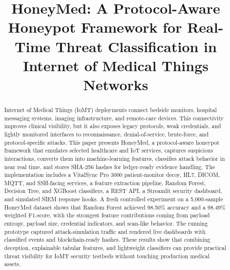 \documentclass[conference, a4paper]{IEEEtran}
\begin{document}
\title{HoneyMed: A Protocol-Aware Honeypot Framework for Real-Time Threat Classification in Internet of Medical Things Networks}

\author{
\and
{}
}

\maketitle

\begin{abstract}
Internet of Medical Things (IoMT) deployments connect bedside monitors, hospital messaging systems, imaging infrastructure, and remote-care devices. This connectivity improves clinical visibility, but it also exposes legacy protocols, weak credentials, and lightly monitored interfaces to reconnaissance, denial-of-service, brute-force, and protocol-specific attacks. This paper presents HoneyMed, a protocol-aware honeypot framework that emulates selected healthcare and IoT services, captures suspicious interactions, converts them into machine-learning features, classifies attack behavior in near real time, and stores SHA-256 hashes for ledger-ready evidence handling. The implementation includes a VitalSync Pro 3000 patient-monitor decoy, HL7, DICOM, MQTT, and SSH-facing services, a feature extraction pipeline, Random Forest, Decision Tree, and XGBoost classifiers, a REST API, a Streamlit security dashboard, and simulated SIEM response hooks. A fresh controlled experiment on a 5,000-sample HoneyMed dataset shows that Random Forest achieved 98.50\% accuracy and a 98.49\% weighted F1-score, with the strongest feature contributions coming from payload entropy, payload size, credential indicators, and scan-like behavior. The running prototype captured attack-simulation traffic and rendered live dashboards with classified events and blockchain-ready hashes. These results show that combining deception, explainable tabular features, and lightweight classifiers can provide practical threat visibility for IoMT security testbeds without touching production medical assets.
\end{abstract}
\end{document}
